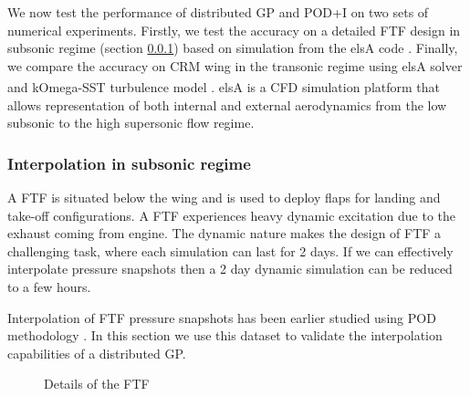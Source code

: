 We now test the performance of distributed GP and POD+I on two sets of numerical experiments. Firstly, we test the accuracy on a detailed FTF design \cite{Bosco2016} in subsonic regime (section \ref{subSec:elsAResults}) based on simulation from the elsA code \cite{cambier2008status}. Finally, we compare the accuracy on CRM wing in the transonic regime using elsA solver and kOmega-SST turbulence model \cite{vassberg2014summary}. elsA\textsuperscript{\textregistered} \cite{cambier2008status} is a CFD simulation platform that allows representation of both internal and external aerodynamics from the low subsonic to the high supersonic flow regime.  

\subsubsection{Interpolation in subsonic regime}\label{subSec:elsAResults}
A FTF is situated below the wing and is used to deploy flaps for landing and take-off configurations. A FTF experiences heavy dynamic excitation due to the exhaust coming from engine. The dynamic nature makes the design of FTF a challenging task, where each simulation can last for 2 days. If we can effectively interpolate pressure snapshots then a 2 day dynamic simulation can be reduced to a few hours. 

Interpolation of FTF pressure snapshots has been earlier studied using POD methodology \cite{bosco2016nonlinear}. In this section we use this dataset to validate the interpolation capabilities of a distributed GP. 


\begin{figure}[!ht]
  \centering
  \quad
  \quad
      \caption{Details of the FTF}
\end{figure}



